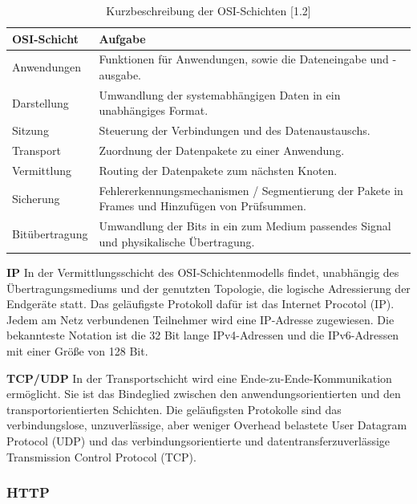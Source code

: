 \newpage

\begin{table}[]
\begin{center}
    \begin{tabular}{| l | p{8cm} |}
    \hline
     OSI-Schicht & Aufgabe \\ 
     \hline
        
       Anwendungen & Funktionen für Anwendungen, sowie die Dateneingabe und -ausgabe. \\
    \hline    
       Darstellung & Umwandlung der systemabhängigen Daten in ein unabhängiges Format.  \\
    \hline   
       Sitzung & Steuerung der Verbindungen und des Datenaustauschs.  \\
    \hline  
        Transport & Zuordnung der Datenpakete zu einer Anwendung. \\ 
    
    \hline     
    	Vermittlung & Routing der Datenpakete zum nächsten Knoten. \\
	
    \hline       
      Sicherung & Fehlererkennungsmechanismen / Segmentierung der Pakete in Frames und Hinzufügen von Prüfsummen.  \\   
    \hline
    
    Bitübertragung & Umwandlung der Bits in ein zum Medium passendes Signal und physikalische Übertragung.\\ 
    \hline    
    \end{tabular}
\end{center}
\caption{Kurzbeschreibung der OSI-Schichten [1.2]}
\end{table}

\textbf{IP}
\newline
In der Vermittlungsschicht des OSI-Schichtenmodells findet, unabhängig des Übertragungsmediums und der genutzten Topologie, die logische Adressierung der Endgeräte statt. Das geläufigste Protokoll dafür ist das Internet Procotol (IP). Jedem am Netz verbundenen Teilnehmer wird eine IP-Adresse zugewiesen. Die bekannteste Notation ist die 32 Bit lange IPv4-Adressen und die IPv6-Adressen mit einer Größe von 128 Bit. 
\newline

\textbf{TCP/UDP}
\newline
In der Transportschicht wird eine Ende-zu-Ende-Kommunikation ermöglicht. Sie ist das Bindeglied zwischen den anwendungsorientierten und den transportorientierten Schichten. Die geläufigsten Protokolle sind das verbindungslose, unzuverlässige, aber weniger Overhead belastete User Datagram Protocol (UDP) und das verbindungsorientierte und datentransferzuverlässige Transmission Control Protocol (TCP).

\subsubsection{HTTP}